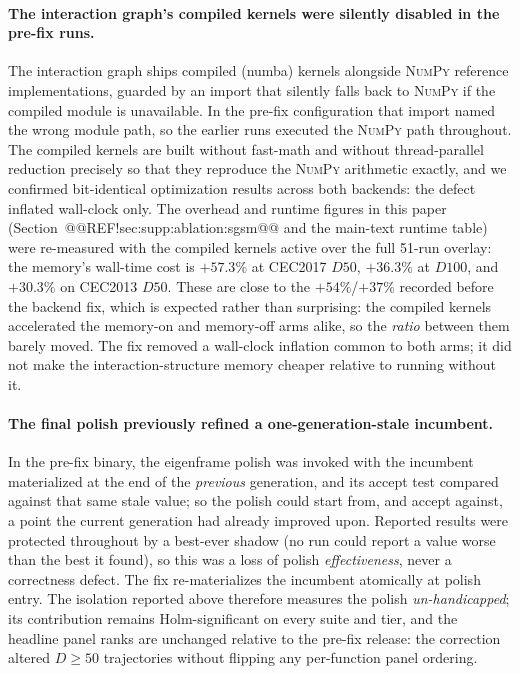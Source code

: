 \documentclass[10pt,a4paper]{article}
\begin{document}
\paragraph{The interaction graph's compiled kernels were silently disabled in the
pre-fix runs.}
The interaction graph ships compiled (numba) kernels alongside \textsc{NumPy}
reference implementations, guarded by an import that silently falls back to
\textsc{NumPy} if the compiled module is unavailable.  In the pre-fix configuration
that import named the wrong module path, so the earlier runs executed the
\textsc{NumPy} path throughout.  The compiled kernels are built without fast-math and
without thread-parallel reduction precisely so that they reproduce the \textsc{NumPy}
arithmetic exactly, and we confirmed bit-identical optimization results across both
backends: the defect inflated wall-clock only.  The overhead and runtime figures
in this paper (Section~@@REF!sec:supp:ablation:sgsm@@ and the main-text runtime table)
were re-measured with the compiled kernels active over the full 51-run overlay:
the memory's wall-time cost is $+57.3\%$ at CEC2017 $D50$, $+36.3\%$ at $D100$,
and $+30.3\%$ on CEC2013 $D50$. These are close to the $+54\%$/$+37\%$ recorded
before the backend fix, which is expected rather than surprising: the compiled
kernels accelerated the memory-on and memory-off arms alike, so the \emph{ratio}
between them barely moved. The fix removed a wall-clock inflation common to both
arms; it did not make the interaction-structure memory cheaper relative to
running without it.

\paragraph{The final polish previously refined a one-generation-stale incumbent.}
In the pre-fix binary, the eigenframe polish was invoked with the incumbent
materialized at the end of the \emph{previous} generation, and its accept test
compared against that same stale value; so the polish could start from, and
accept against, a point the current generation had already improved upon.  Reported
results were protected throughout by a best-ever shadow (no run could report a value
worse than the best it found), so this was a loss of polish \emph{effectiveness},
never a correctness defect.  The fix re-materializes the incumbent atomically at
polish entry.  The isolation reported above therefore measures the polish
\emph{un-handicapped}; its contribution remains Holm-significant on every suite and
tier, and the headline panel ranks are unchanged relative to the pre-fix release:
the correction altered $D \geq 50$ trajectories without flipping any per-function
panel ordering.
\end{document}
